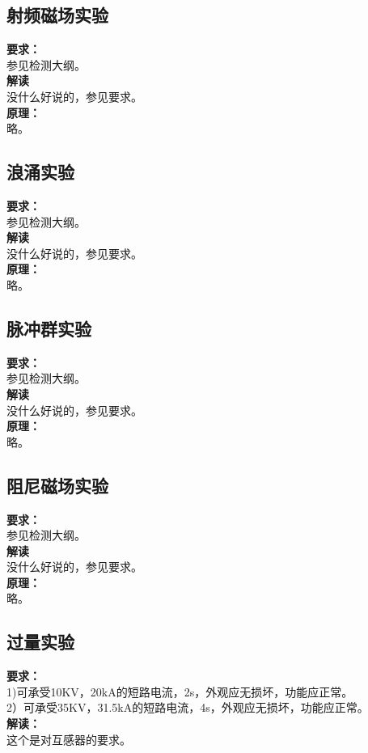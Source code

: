 \documentclass{article}
\begin{document}
\begin{CJK}{UTF8}{gbsn}
\subsection{ 射频磁场实验}
	\par
	\textbf{要求：}\\
	参见检测大纲。\\
	\textbf{解读}\\
	没什么好说的，参见要求。\\
	\textbf{原理：}\\
	略。

\subsection{ 浪涌实验}
	\par
	\textbf{要求：}\\
	参见检测大纲。\\
	\textbf{解读}\\
	没什么好说的，参见要求。\\
	\textbf{原理：}\\
	略。

\subsection{ 脉冲群实验}
	\par
	\textbf{要求：}\\
	参见检测大纲。\\
	\textbf{解读}\\
	没什么好说的，参见要求。\\
	\textbf{原理：}\\
	略。

\subsection{ 阻尼磁场实验}
	\par
	\textbf{要求：}\\
	参见检测大纲。\\
	\textbf{解读}\\
	没什么好说的，参见要求。\\
	\textbf{原理：}\\
	略。

\subsection{ 过量实验}
	\par
	\textbf{要求：}\\
	1)可承受10KV，20kA的短路电流，2s，外观应无损坏，功能应正常。\\
	2）可承受35KV，31.5kA的短路电流，4s，外观应无损坏，功能应正常。\\
	\textbf{解读：}\\
	这个是对互感器的要求。


\end{CJK}
\end{document}
